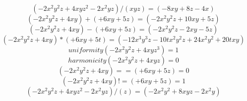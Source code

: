 \documentclass{article}
\begin{document}
$$(-2x^{2}y^{2}z+4xyz^{2}-2x^{2}yz) / (x y z) = (-8xy+8z-4x)$$
$$(-2x^{2}y^{2}z+4xy) + (+6xy+5z) = (-2x^{2}y^{2}z+10xy+5z)$$
$$(-2x^{2}y^{2}z+4xy) - (+6xy+5z) = (-2x^{2}y^{2}z-2xy-5z)$$
$$(-2x^{2}y^{2}z+4xy) * (+6xy+5t) = (-12x^{3}y^{3}z-10tx^{2}y^{2}z+24x^{2}y^{2}+20txy)$$
$$uniformity(-2x^{2}y^{2}z+4xyz^{3}) = 1$$
$$harmonicity(-2x^{2}y^{2}z+4xyz) = 0$$
$$(-2x^{2}y^{2}z+4xy) == (+6xy+5z) = 0$$
$$(-2x^{2}y^{2}z+4xy) != (+6xy+5z) = 1$$
$$(-2x^{2}y^{2}z+4xyz^{2}-2x^{2}yz) / (z) = (-2x^{2}y^{2}+8xyz-2x^{2}y)$$
\end{document}
